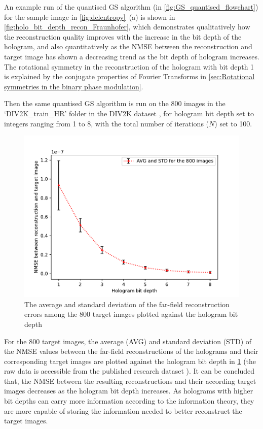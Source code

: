 	An example run of the quantised GS algorithm (in \cref{fig:GS_quantised_flowchart}) for the sample image in \cref{fig:delentropy}~(a) is shown in \cref{fig:holo_bit_depth_recon_Fraunhofer}, which demonstrates qualitatively how the reconstruction quality improves with the increase in the bit depth of the hologram, and also quantitatively as the NMSE between the reconstruction and target image has shown a decreasing trend as the bit depth of hologram increases. The rotational symmetry in the reconstruction of the hologram with bit depth 1 is explained by the conjugate properties of Fourier Transforms in \cref{sec:Rotational symmetries in the binary phase modulation}.

	Then the same quantised GS algorithm is run on the 800 images in the `DIV2K\_train\_HR' folder in the DIV2K dataset \cite{Agustsson2017}, for hologram bit depth set to integers ranging from 1 to 8, with the total number of iterations ($N$) set to 100.

	\begin{figure} [H]
	   \begin{center}
	   \includegraphics[width = \textwidth]{GS_Fraunhofer_NMSE_VS_Hologram bit depth.pdf}
	   \end{center}
	   \caption{\label{fig:GS_Fraunhofer_NMSE_VS_Hologram_bit_depth} The average and standard deviation of the far-field reconstruction errors among the 800 target images plotted against the hologram bit depth}
	\end{figure}

	For the 800 target images, the average (AVG) and standard deviation (STD) of the NMSE values between the far-field reconstructions of the holograms and their corresponding target images are plotted against the hologram bit depth in \cref{fig:GS_Fraunhofer_NMSE_VS_Hologram_bit_depth} (the raw data is accessible from the published research dataset \cite{research_data_Sha2024}). It can be concluded that, the NMSE between the resulting reconstructions and their according target images decreases as the hologram bit depth increases. As holograms with higher bit depths can carry more information according to the information theory, they are more capable of storing the information needed to better reconstruct the target images.

